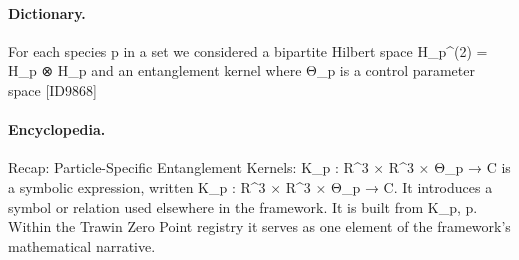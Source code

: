 \paragraph{Dictionary.}
For each species p in a set we considered a bipartite Hilbert space H\_p\textasciicircum{}(2) = H\_p ⊗ H\_p and an entanglement kernel where Θ\_p is a control parameter space [ID9868]

\paragraph{Encyclopedia.}
Recap: Particle-Specific Entanglement Kernels: K\_p : R\textasciicircum{}3 × R\textasciicircum{}3 × Θ\_p → C is a symbolic expression, written K\_p : R\textasciicircum{}3 × R\textasciicircum{}3 × Θ\_p → C. It introduces a symbol or relation used elsewhere in the framework. It is built from K\_p, p. Within the Trawin Zero Point registry it serves as one element of the framework's mathematical narrative.
